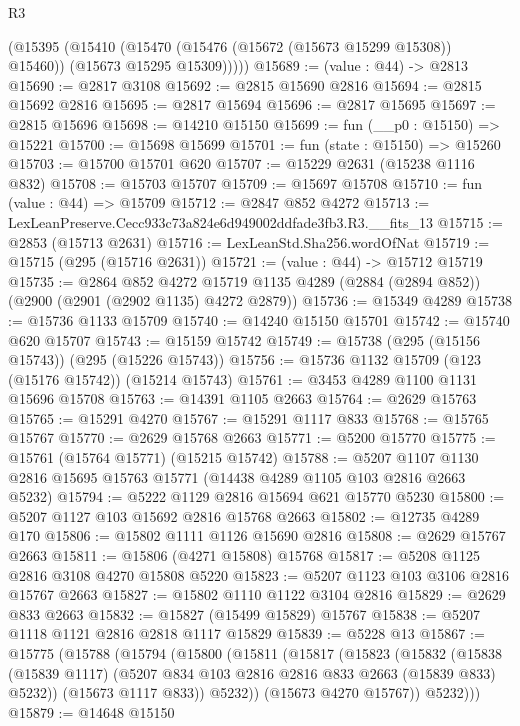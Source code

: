 \begin{lexlean}{R3}
\begin{coremodule}
        (@15395
          (@15410
            (@15470 (@15476 (@15672 (@15673 @15299 @15308)) @15460))
            (@15673 @15295 @15309)))))
@15689 := (value : @44) -> @2813
@15690 := @2817 @3108
@15692 := @2815 @15690 @2816
@15694 := @2815 @15692 @2816
@15695 := @2817 @15694
@15696 := @2817 @15695
@15697 := @2815 @15696
@15698 := @14210 @15150
@15699 := fun (__p0 : @15150) => @15221
@15700 := @15698 @15699
@15701 := fun (state : @15150) => @15260
@15703 := @15700 @15701 @620
@15707 := @15229 @2631 (@15238 @1116 @832)
@15708 := @15703 @15707
@15709 := @15697 @15708
@15710 := fun (value : @44) => @15709
@15712 := @2847 @852 @4272
@15713 := LexLeanPreserve.Cecc933c73a824e6d949002ddfade3fb3.R3.__fits_13
@15715 := @2853 (@15713 @2631)
@15716 := LexLeanStd.Sha256.wordOfNat
@15719 := @15715 (@295 (@15716 @2631))
@15721 := (value : @44) -> @15712 @15719
@15735 := @2864
    @852
    @4272
    @15719
    @1135
    @4289
    (@2884 (@2894 @852))
    (@2900 (@2901 (@2902 @1135) @4272 @2879))
@15736 := @15349 @4289
@15738 := @15736 @1133 @15709
@15740 := @14240 @15150 @15701
@15742 := @15740 @620 @15707
@15743 := @15159 @15742
@15749 := @15738 (@295 (@15156 @15743)) (@295 (@15226 @15743))
@15756 := @15736 @1132 @15709 (@123 (@15176 @15742)) (@15214 @15743)
@15761 := @3453 @4289 @1100 @1131 @15696 @15708
@15763 := @14391 @1105 @2663
@15764 := @2629 @15763
@15765 := @15291 @4270
@15767 := @15291 @1117 @833
@15768 := @15765 @15767
@15770 := @2629 @15768 @2663
@15771 := @5200 @15770
@15775 := @15761 (@15764 @15771) (@15215 @15742)
@15788 := @5207 @1107 @1130 @2816 @15695 @15763 @15771 (@14438 @4289 @1105 @103 @2816 @2663 @5232)
@15794 := @5222 @1129 @2816 @15694 @621 @15770 @5230
@15800 := @5207 @1127 @103 @15692 @2816 @15768 @2663
@15802 := @12735 @4289 @170
@15806 := @15802 @1111 @1126 @15690 @2816
@15808 := @2629 @15767 @2663
@15811 := @15806 (@4271 @15808) @15768
@15817 := @5208 @1125 @2816 @3108 @4270 @15808 @5220
@15823 := @5207 @1123 @103 @3106 @2816 @15767 @2663
@15827 := @15802 @1110 @1122 @3104 @2816
@15829 := @2629 @833 @2663
@15832 := @15827 (@15499 @15829) @15767
@15838 := @5207 @1118 @1121 @2816 @2818 @1117 @15829
@15839 := @5228 @13
@15867 := @15775
    (@15788
      (@15794
        (@15800
          (@15811
            (@15817
              (@15823
                (@15832
                  (@15838
                    (@15839 @1117)
                    (@5207 @834 @103 @2816 @2816 @833 @2663 (@15839 @833) @5232))
                  (@15673 @1117 @833))
                @5232))
            (@15673 @4270 @15767))
          @5232)))
@15879 := @14648
    @15150

\end{coremodule}
\end{lexlean}
